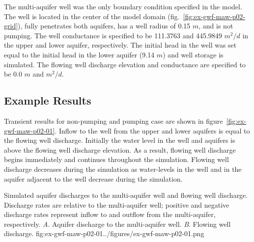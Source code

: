 The multi-aquifer well was the only boundary condition specified in the model. The well is located in the center of the model domain (fig.~\ref{fig:ex-gwf-maw-p02-grid}), fully penetrates both aquifers, has a well radius of 0.15 $m$, and is not pumping. The well conductance is specified to be 111.3763 and 445.9849 $m^{2}/d$ in the upper and lower aquifer, respectively. The initial head in the well was set equal to the initial head in the lower aquifer (9.14 $m$) and well storage is simulated. The flowing well discharge elevation and conductance are specified to be 0.0 $m$ and $m^{2}/d$.

\subsection{Example Results}

Transient results for non-pumping and pumping case are shown in figure~\ref{fig:ex-gwf-maw-p02-01}. Inflow to the well from the upper and lower aquifers is equal to the flowing well discharge. Initially the water level in the well and aquifers is above the flowing well discharge elevation. As a result, flowing well discharge begins immediately and continues throughout the simulation. Flowing well discharge decreases during the simulation as water-levels in the well and in the aquifer adjacent to the well decrease during the simulation.


\begin{StandardFigure}{
                                     Simulated aquifer discharges to the multi-aquifer well and flowing well discharge. 
                                     Discharge rates are relative to the multi-aquifer well; positive and negative discharge rates 
                                     represent inflow to and outflow from the multi-aquifer, respectively.
                                     \textit{A}. Aquifer discharge to the multi-aquifer well.
                                     \textit{B}. Flowing well discharge. 
                                     }{fig:ex-gwf-maw-p02-01}{../figures/ex-gwf-maw-p02-01.png}
\end{StandardFigure}                                 


